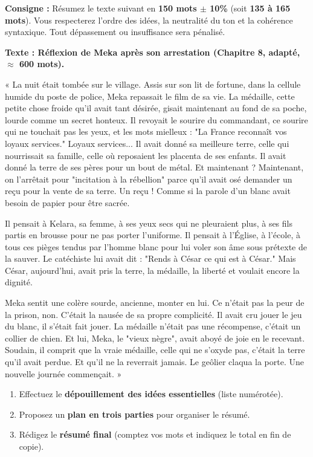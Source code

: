 \documentclass[11pt]{article}
\newcounter{popsec}
\newcounter{popsub}
\newcommand{\courssub}[1]{%
  \stepcounter{popsub}%
  \par\vspace{9pt}\noindent{\popxbold\fontsize{11.5}{13}\selectfont\color{popink}{\color{poporange}\thepopsec.\thepopsub}\hspace{6pt}#1}\par\nopagebreak\vspace{4pt}
}
\begin{document}
\courssub{Je me prépare au Bac}

\begin{exercice}
\textbf{Consigne :} Résumez le texte suivant en \textbf{150 mots $\pm$ 10\%} (soit \textbf{135 à 165 mots}). Vous respecterez l'ordre des idées, la neutralité du ton et la cohérence syntaxique. Tout dépassement ou insuffisance sera pénalisé.

\textbf{Texte : Réflexion de Meka après son arrestation (Chapitre 8, adapté, $\approx$ 600 mots).}

« La nuit était tombée sur le village. Assis sur son lit de fortune, dans la cellule humide du poste de police, Meka repassait le film de sa vie. La médaille, cette petite chose froide qu'il avait tant désirée, gisait maintenant au fond de sa poche, lourde comme un secret honteux. Il revoyait le sourire du commandant, ce sourire qui ne touchait pas les yeux, et les mots mielleux : "La France reconnaît vos loyaux services." Loyaux services... Il avait donné sa meilleure terre, celle qui nourrissait sa famille, celle où reposaient les placenta de ses enfants. Il avait donné la terre de ses pères pour un bout de métal. Et maintenant ? Maintenant, on l'arrêtait pour "incitation à la rébellion" parce qu'il avait osé demander un reçu pour la vente de sa terre. Un reçu ! Comme si la parole d'un blanc avait besoin de papier pour être sacrée.

Il pensait à Kelara, sa femme, à ses yeux secs qui ne pleuraient plus, à ses fils partis en brousse pour ne pas porter l'uniforme. Il pensait à l'Église, à l'école, à tous ces pièges tendus par l'homme blanc pour lui voler son âme sous prétexte de la sauver. Le catéchiste lui avait dit : "Rends à César ce qui est à César." Mais César, aujourd'hui, avait pris la terre, la médaille, la liberté et voulait encore la dignité.

Meka sentit une colère sourde, ancienne, monter en lui. Ce n'était pas la peur de la prison, non. C'était la nausée de sa propre complicité. Il avait cru jouer le jeu du blanc, il s'était fait jouer. La médaille n'était pas une récompense, c'était un collier de chien. Et lui, Meka, le "vieux nègre", avait aboyé de joie en le recevant. Soudain, il comprit que la vraie médaille, celle qui ne s'oxyde pas, c'était la terre qu'il avait perdue. Et qu'il ne la reverrait jamais. Le geôlier claqua la porte. Une nouvelle journée commençait. »

\begin{enumerate}
    \item Effectuez le \textbf{dépouillement des idées essentielles} (liste numérotée).
    \item Proposez un \textbf{plan en trois parties} pour organiser le résumé.
    \item Rédigez le \textbf{résumé final} (comptez vos mots et indiquez le total en fin de copie).
\end{enumerate}
\end{exercice}
\end{document}
